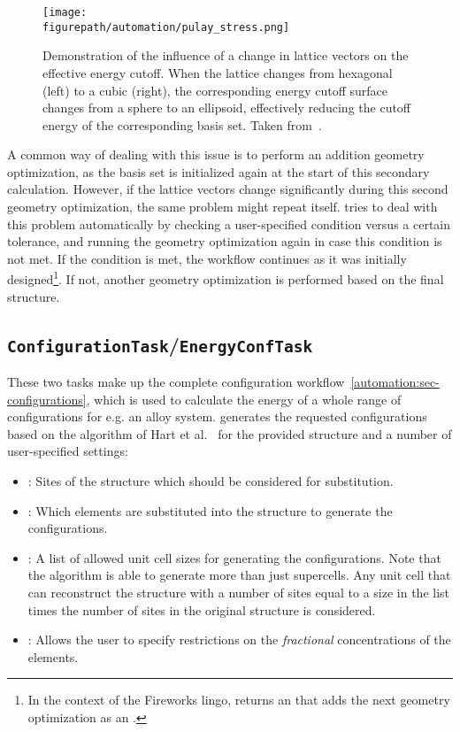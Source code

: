 \begin{refsection}
\begin{figure}
\centering
\texttt{[image: \\figurepath/automation/pulay\_stress.png]}
\caption{Demonstration of the influence of a change in lattice vectors on the effective energy cutoff. When the lattice changes from hexagonal (left) to a cubic (right), the corresponding energy cutoff surface changes from a sphere to an ellipsoid, effectively reducing the cutoff energy of the corresponding basis set. Taken from~\cite{Pulay}.}
\label{automation:fig-pulay}
\end{figure}

A common way of dealing with this issue is to perform an addition geometry optimization, as the basis set is initialized again at the start of this secondary calculation. However, if the lattice vectors change significantly during this second geometry optimization, the same problem might repeat itself.  tries to deal with this problem automatically by checking a user-specified condition versus a certain tolerance, and running the geometry optimization again in case this condition is not met. If the condition is met, the workflow continues as it was initially designed\footnote{In the context of the Fireworks lingo,  returns an  that adds the next geometry optimization as an .}. If not, another geometry optimization is performed based on the final structure.

\subsection{\texttt{ConfigurationTask}/\texttt{EnergyConfTask}} \label{automation:sec-ConfigurationTask} \label{automation:sec-EnergyConfTask}

These two tasks make up the complete configuration workflow~\ref{automation:sec-configurations}, which is used to calculate the energy of a whole range of configurations for e.g. an alloy system.  generates the requested configurations based on the algorithm of Hart et al.~\cite{Hart2005} for the provided structure and a number of user-specified settings:

\begin{itemize}
\item {}: Sites of the structure which should be considered for substitution.
\item {}: Which elements are substituted into the structure to generate the configurations.
\item {} : A list of allowed unit cell sizes for generating the configurations. Note that the algorithm is able to generate more than just supercells. Any unit cell that can reconstruct the structure with a number of sites equal to a size in the list times the number of sites in the original structure is considered.
\item {}: Allows the user to specify restrictions on the \textit{fractional} concentrations of the elements.
\end{itemize}


\end{refsection}
